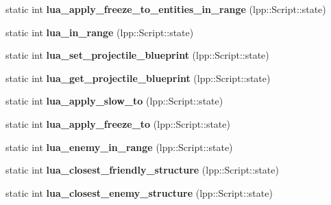 \begin{DoxyCompactItemize}
\item 
static int {\bfseries lua\+\_\+apply\+\_\+freeze\+\_\+to\+\_\+entities\+\_\+in\+\_\+range} (lpp\+::\+Script\+::state)\hypertarget{class_lua_interface_a5f27f95233f28fff6a52d862fac95e52}{}\label{class_lua_interface_a5f27f95233f28fff6a52d862fac95e52}

\item 
static int {\bfseries lua\+\_\+in\+\_\+range} (lpp\+::\+Script\+::state)\hypertarget{class_lua_interface_acdbad02a31adadf8c139e21df13c8449}{}\label{class_lua_interface_acdbad02a31adadf8c139e21df13c8449}

\item 
static int {\bfseries lua\+\_\+set\+\_\+projectile\+\_\+blueprint} (lpp\+::\+Script\+::state)\hypertarget{class_lua_interface_a97930128422ba709f1635253c98f6516}{}\label{class_lua_interface_a97930128422ba709f1635253c98f6516}

\item 
static int {\bfseries lua\+\_\+get\+\_\+projectile\+\_\+blueprint} (lpp\+::\+Script\+::state)\hypertarget{class_lua_interface_a815a49f45b25a381a9fe68cdcb0d7a00}{}\label{class_lua_interface_a815a49f45b25a381a9fe68cdcb0d7a00}

\item 
static int {\bfseries lua\+\_\+apply\+\_\+slow\+\_\+to} (lpp\+::\+Script\+::state)\hypertarget{class_lua_interface_a1c026c5e2599a0dd41b4765180de42e0}{}\label{class_lua_interface_a1c026c5e2599a0dd41b4765180de42e0}

\item 
static int {\bfseries lua\+\_\+apply\+\_\+freeze\+\_\+to} (lpp\+::\+Script\+::state)\hypertarget{class_lua_interface_a4c595bd5e69d487da17b4750144e3522}{}\label{class_lua_interface_a4c595bd5e69d487da17b4750144e3522}

\item 
static int {\bfseries lua\+\_\+enemy\+\_\+in\+\_\+range} (lpp\+::\+Script\+::state)\hypertarget{class_lua_interface_ab6d49d882926e1987a0ac1964904a3cc}{}\label{class_lua_interface_ab6d49d882926e1987a0ac1964904a3cc}

\item 
static int {\bfseries lua\+\_\+closest\+\_\+friendly\+\_\+structure} (lpp\+::\+Script\+::state)\hypertarget{class_lua_interface_a09f85c87099f7d43a1d712e04da88bf8}{}\label{class_lua_interface_a09f85c87099f7d43a1d712e04da88bf8}

\item 
static int {\bfseries lua\+\_\+closest\+\_\+enemy\+\_\+structure} (lpp\+::\+Script\+::state)\hypertarget{class_lua_interface_a1c94a3eb66206163eecc2d15dc6379af}{}\label{class_lua_interface_a1c94a3eb66206163eecc2d15dc6379af}


\end{DoxyCompactItemize}
